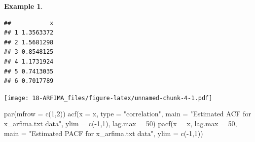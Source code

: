 \documentclass[
]{book}
\newenvironment{Shaded}{\begin{snugshade}}{\end{snugshade}}
\newcommand{\AttributeTok}[1]{\textcolor[rgb]{0.77,0.63,0.00}{#1}}
\newcommand{\DecValTok}[1]{\textcolor[rgb]{0.00,0.00,0.81}{#1}}
\newcommand{\FunctionTok}[1]{\textcolor[rgb]{0.00,0.00,0.00}{#1}}
\newcommand{\NormalTok}[1]{#1}
\newcommand{\OtherTok}[1]{\textcolor[rgb]{0.56,0.35,0.01}{#1}}
\newcommand{\SpecialCharTok}[1]{\textcolor[rgb]{0.00,0.00,0.00}{#1}}
\newcommand{\StringTok}[1]{\textcolor[rgb]{0.31,0.60,0.02}{#1}}
\theoremstyle{definition}
\theoremstyle{definition}
\newtheorem{example}{Example}[chapter]
\theoremstyle{definition}
\theoremstyle{definition}
\theoremstyle{remark}
\begin{document}
\begin{example}
\begin{verbatim}
##           x
## 1 1.3563372
## 2 1.5681298
## 3 0.8548125
## 4 1.1731924
## 5 0.7413035
## 6 0.7017789
\end{verbatim}

\begin{Shaded}
\end{Shaded}

\texttt{[image: 18-ARFIMA\_files/figure-latex/unnamed-chunk-4-1.pdf]}

\begin{Shaded}
\begin{Highlighting}[]
\FunctionTok{par}\NormalTok{(}\AttributeTok{mfrow =} \FunctionTok{c}\NormalTok{(}\DecValTok{1}\NormalTok{,}\DecValTok{2}\NormalTok{))}
\FunctionTok{acf}\NormalTok{(}\AttributeTok{x =}\NormalTok{ x, }\AttributeTok{type =} \StringTok{"correlation"}\NormalTok{, }\AttributeTok{main =} \StringTok{"Estimated ACF }
\StringTok{    for x\_arfima.txt data"}\NormalTok{, }\AttributeTok{ylim =} \FunctionTok{c}\NormalTok{(}\SpecialCharTok{{-}}\DecValTok{1}\NormalTok{,}\DecValTok{1}\NormalTok{), }\AttributeTok{lag.max =} \DecValTok{50}\NormalTok{)}
\FunctionTok{pacf}\NormalTok{(}\AttributeTok{x =}\NormalTok{ x, }\AttributeTok{lag.max =} \DecValTok{50}\NormalTok{, }\AttributeTok{main =} \StringTok{"Estimated PACF for }
\StringTok{    x\_arfima.txt data"}\NormalTok{, }\AttributeTok{ylim =} \FunctionTok{c}\NormalTok{(}\SpecialCharTok{{-}}\DecValTok{1}\NormalTok{,}\DecValTok{1}\NormalTok{))}
\end{Highlighting}
\end{Shaded}


\end{example}
\end{document}

